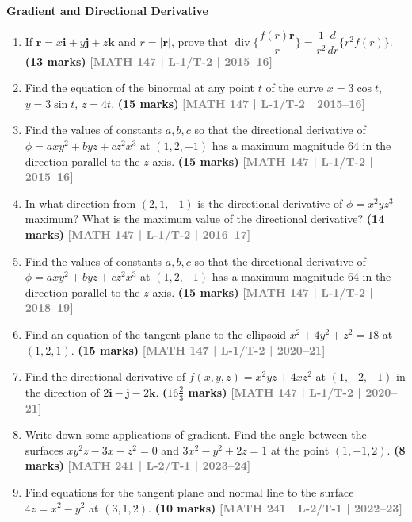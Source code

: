 \documentclass[12pt,a4paper]{article}
\newcommand{\yr}[1]{\hfill\textcolor{gray}{\small\textbf{[#1]}}}
\newcommand{\mk}[1]{\textcolor{orange!70!black}{\small\textbf{(#1 marks)}}}
\newcommand{\subtopic}[2]{%
  \vspace{10pt}
  \noindent\begin{tcolorbox}[colback=#1!8,colframe=#1,boxrule=0.6pt,arc=4pt,
    left=6pt,right=6pt,top=4pt,bottom=4pt]
    \small\bfseries\textcolor{#1}{#2}
  \end{tcolorbox}
  \vspace{2pt}
}
\begin{document}
\subtopic{cD}{Gradient and Directional Derivative}
\label{sub:s4-gradient}

\begin{enumerate}

\item If $\mathbf{r}=x\mathbf{i}+y\mathbf{j}+z\mathbf{k}$ and $r=|\mathbf{r}|$, prove that $\operatorname{div}\{\dfrac{f(r)\mathbf{r}}{r}\}=\dfrac{1}{r^{2}}\dfrac{d}{dr}\{r^{2}f(r)\}$.
\mk{13} \yr{MATH 147 | L-1/T-2 | 2015--16}

\item Find the equation of the binormal at any point $t$ of the curve $x=3\cos t$, $y=3\sin t$, $z=4t$.
\mk{15} \yr{MATH 147 | L-1/T-2 | 2015--16}

\item Find the values of constants $a,b,c$ so that the directional derivative of $\phi=axy^{2}+byz+cz^{2}x^{3}$ at $(1,2,-1)$ has a maximum magnitude 64 in the direction parallel to the $z$-axis.
\mk{15} \yr{MATH 147 | L-1/T-2 | 2015--16}

\item In what direction from $(2,1,-1)$ is the directional derivative of $\phi=x^{2}yz^{3}$ maximum? What is the maximum value of the directional derivative?
\mk{14} \yr{MATH 147 | L-1/T-2 | 2016--17}

\item Find the values of constants $a,b,c$ so that the directional derivative of $\phi=axy^{2}+byz+cz^{2}x^{3}$ at $(1,2,-1)$ has a maximum magnitude 64 in the direction parallel to the $z$-axis.
\mk{15} \yr{MATH 147 | L-1/T-2 | 2018--19}

\item Find an equation of the tangent plane to the ellipsoid $x^{2}+4y^{2}+z^{2}=18$ at $(1,2,1)$.
\mk{15} \yr{MATH 147 | L-1/T-2 | 2020--21}

\item Find the directional derivative of $f(x,y,z)=x^{2}yz+4xz^{2}$ at $(1,-2,-1)$ in the direction of $2\mathbf{i}-\mathbf{j}-2\mathbf{k}$.
\mk{$16\tfrac{2}{3}$} \yr{MATH 147 | L-1/T-2 | 2020--21}

\item Write down some applications of gradient. Find the angle between the surfaces $xy^{2}z-3x-z^{2}=0$ and $3x^{2}-y^{2}+2z=1$ at the point $(1,-1,2)$.
\mk{8} \yr{MATH 241 | L-2/T-1 | 2023--24}

\item Find equations for the tangent plane and normal line to the surface $4z=x^{2}-y^{2}$ at $(3,1,2)$.
\mk{10} \yr{MATH 241 | L-2/T-1 | 2022--23}


\end{enumerate}
\end{document}
